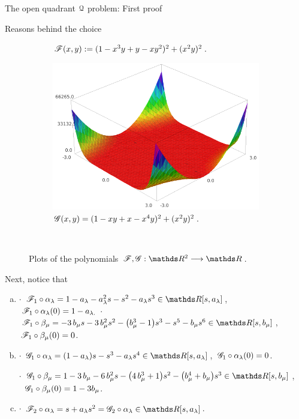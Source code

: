 \documentclass[11pt, a4paper, english, twoside, notitlepage, openright]{report}
\begin{document}
\begin{chapter}{The open quadrant $\mathcal{Q}$ problem: First proof}
\begin{section}{Reasons behind the choice}
\begin{figure}[h]
\begin{subfigure}{.49\linewidth}
\caption{$\mathscr{F}(x,y):=(1-x^3y+y-xy^2)^2+(x^2y)^2$.\label{fig:F}}
\end{subfigure}
\begin{subfigure}{.50\linewidth}\centering
\includegraphics[width=1\textwidth]{plots/ch1_05_G.png}
\caption{$\mathscr{G}(x,y)=(1-xy+x-x^4y)^2+(x^2y)^2$.\label{fig:G}}
\end{subfigure}\\[1ex]
\caption{Plots of the polynomials $\F,\G:\R^2\longrightarrow\R$.\label{fig:plotFG}}
\end{figure}
Next, notice that
\begin{enumerate}[(a)]
\item $\cdot$ $\F_1\circ\alpha_\lambda=1-a_{\lambda}-a_{\lambda}^{2} s-s^{2}-a_{\lambda} s^{3}\in\R[s,a_{\lambda}]$,
$\, \mathscr{F}_1\circ\alpha_{\lambda }(0)=1-a_{\lambda. }$ \newline
$\cdot$ $\F_1\circ\beta_{\mu}=-3\,b_{\mu}s-3 \,b_{\mu}^{2} s^{2}-{\left(b_{\mu}^{3}-1\right)}s^{3}-s^{5}-b_{\mu}s^{6}\in\R[s,b_{\mu}]$,
$\, \mathscr{F}_1\circ\beta_{\mu}(0)=0$.
				
\item $\cdot$ $ \G_1\circ\alpha_{\lambda } = {\left(1-a_{\lambda} \right)}s-s^{3}-a_{\lambda} s^{4} \in\R[s,a_{\lambda}]$,
$\, \mathscr{G}_1\circ\alpha_{\lambda }(0)=0$.

$\cdot$ $\G_1\circ\beta_{\mu}=1-3\, b_{\mu}-6\,b_{\mu}^{2}s-{\left(4\,b_{\mu}^{3}+1\right)}s^{2}-{\left(b_{\mu}^{4}+ b_{\mu}\right)}s^{3}\in\R[s,b_{\mu}]$,  $\ \ \G_1\circ\beta_{\mu}(0)=1-3b_{\mu}$.
		
\item $\cdot$ $\F_2\circ\alpha_{\lambda }= s+a_{\lambda} s^{2} = \G_2\circ\alpha_{\lambda}\in\R[s,a_{\lambda }]$.
			

\end{enumerate}
\end{section}
\end{chapter}
\end{document}

